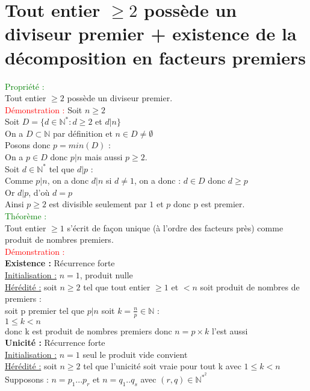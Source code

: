 \documentclass{article}
\begin{document}
\section{Tout entier $\geq 2$ possède un diviseur premier + existence de la décomposition en facteurs premiers}
\textcolor{green}{Propriété :} \\ 
Tout entier $\geq 2$ possède un diviseur premier. \\ 
\textcolor{red}{Démonstration :} Soit $n \geq 2$ \\ 
Soit $D=\lbrace d \in \mathbb{N}^\ast : d \geq 2$ et $d|n\rbrace$ \\ 
On a $D \subset \mathbb{N}$ par définition et $n \in D \neq \emptyset$ \\ 
Posons donc $p=min(D)$ : \\ 
On a $p \in D$ donc $p|n$ mais aussi $p \geq 2$. \\ 
Soit $d \in \mathbb{N}^ \ast$ tel que $d|p$ : \\ 
Comme $p|n$, on a donc $d|n$ si $d \neq 1$, on a donc : $d \in D$ donc $d \geq p$ \\ 
Or $d|p$, d'où $d=p$ \\ 
Ainsi $p\geq 2$ est divisible seulement par $1$ et $p$ donc p est premier. \\
\textcolor{green}{Théorème :}\\ 
Tout entier $\geq 1$ s'écrit de façon unique (à l'ordre  des facteurs près) comme produit de nombres premiers. \\ 
\textcolor{red}{Démonstration :} \\ 
{\bf Existence :} Récurrence forte \\ 
\underline{Initialisation :} $n=1$, produit nulle \\ 
\underline{Hérédité :} soit $n \geq 2$ tel que tout entier $\geq 1$ et $<n$ soit produit de nombres de premiers : \\ 
soit p premier tel que $p|n$ soit $k=\frac{n}{p}\in \mathbb{N}$ : \\
$1 \leq k <n$ \\ 
donc k est produit de nombres premiers donc $n=p \times k$ l'est aussi \\ 
{\bf Unicité :} Récurrence forte \\ 
\underline{Initialisation :} $n=1$ seul le produit vide convient \\ 
\underline{Hérédité :} soit $n \geq 2$ tel que l'unicité soit vraie pour tout k avec $1 \leq k <n$ \\ 
Supposons : $n=p_1...p_r$ et $n=q_1..q_s$ avec $(r,q) \in \mathbb{N}^{\ast^2}$ \\ 
\end{document}
